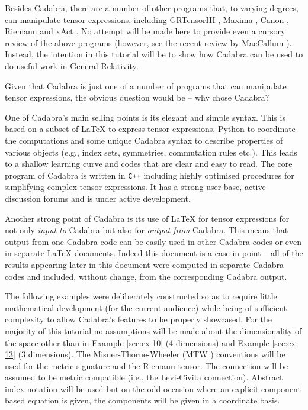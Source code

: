 \documentclass[a4paper,12pt]{article}
\numberwithin{equation}{section}%
\begin{document}
Besides Cadabra, there are a number of other programs that, to varying degrees,
can manipulate tensor expressions, including
GRTensorIII \cite{grtensorIII:2017-01},
Maxima \cite{maxima:2014-01},
Canon \cite{manssur:2004-01},
Riemann \cite{portugal:1997-01} and
xAct \cite{xact:2008-01}.
No attempt will be made here to provide even a cursory review of the above programs
(however, see the recent review by MacCallum \cite{maccallum:2018-01}). Instead, the
intention in this tutorial will be to show how Cadabra can be used to do useful work in
General Relativity.

Given that Cadabra is just one of a number of programs that can manipulate tensor
expressions, the obvious question would be -- why chose Cadabra?

One of Cadabra's main selling points is its elegant and simple syntax. This is based on a
subset of LaTeX to express tensor expressions, Python to coordinate the computations and some
unique Cadabra syntax to describe properties of various objects (e.g., index sets,
symmetries, commutation rules etc.). This leads to a shallow learning curve and codes that
are clear and easy to read. The core program of Cadabra is written in {\tt C++} including
highly optimised procedures for simplifying complex tensor expressions. It has a strong user
base, active discussion forums and is under active development.

Another strong point of Cadabra is its use of LaTeX for tensor expressions for not only
\emph{input to} Cadabra but also for \emph{output from} Cadabra. This means that output from
one Cadabra code can be easily used in other Cadabra codes or even in separate LaTeX
documents. Indeed this document is a case in point -- all of the results appearing later in
this document were computed in separate Cadabra codes and included, without change, from the
corresponding Cadabra output.

The following examples were deliberately constructed so as to require little mathematical
development (for the current audience) while being of sufficient complexity to allow
Cadabra's features to be properly showcased. For the majority of this tutorial no
assumptions will be made about the dimensionality of the space other than in Example
\ref{sec:ex-10} (4 dimensions) and Example \ref{sec:ex-13} (3 dimensions). The
Misner-Thorne-Wheeler (MTW \cite{mtw:1973-01}) conventions will be used for the metric
signature and the Riemann tensor. The connection will be assumed to be metric compatible
(i.e., the Levi-Civita connection). Abstract index notation will be used but on the odd
occasion where an explicit component based equation is given, the components will be given
in a coordinate basis.
\end{document}
